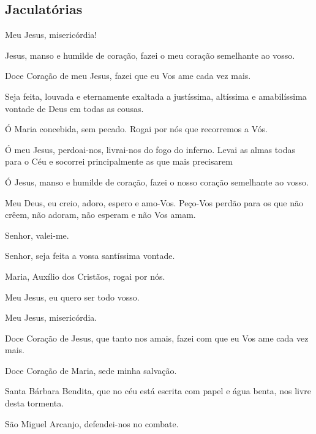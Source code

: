 \subsection{Jaculatórias}
Meu Jesus, misericórdia!\par
Jesus, manso e humilde de coração, fazei o meu coração semelhante ao vosso.\par
Doce Coração de meu Jesus, fazei que eu Vos ame cada vez mais.\par
Seja feita, louvada e eternamente exaltada a justíssima, altíssima e amabilíssima vontade de Deus em todas as cousas.\par
Ó Maria concebida, sem pecado. Rogai por nós que recorremos a Vós.\par
Ó meu Jesus, perdoai-nos, livrai-nos do fogo do inferno. Levai as almas
todas para o Céu e socorrei principalmente as que mais precisarem\par
Ó Jesus, manso e humilde de coração, fazei o nosso coração semelhante
ao vosso.\par
Meu Deus, eu creio, adoro, espero e amo-Vos. Peço-Vos perdão para os que
não crêem, não adoram, não esperam e não Vos amam.\par
Senhor, valei-me.\par
Senhor, seja feita a vossa santíssima vontade.\par
Maria, Auxílio dos Cristãos, rogai por nós.\par
Meu Jesus, eu quero ser todo vosso.\par
Meu Jesus, misericórdia.\par
Doce Coração de Jesus, que tanto nos amais, fazei com que eu Vos ame cada vez mais.\par
Doce Coração de Maria, sede minha salvação.\par
Santa Bárbara Bendita, que no céu está escrita com papel e água benta, nos livre desta tormenta.\par
São Miguel Arcanjo, defendei-nos no combate.\par


